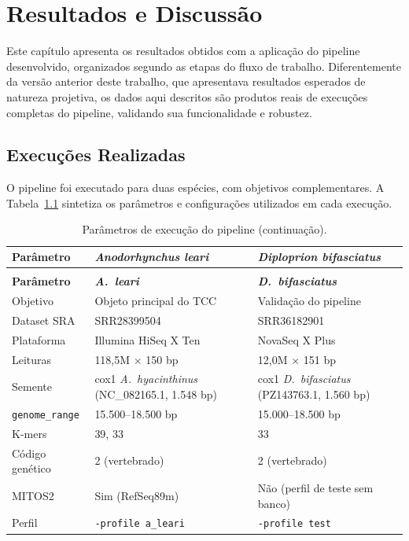 
\chapter{Resultados e Discussão}
\label{cap:resultados}

Este capítulo apresenta os resultados obtidos com a aplicação do pipeline desenvolvido, organizados segundo as etapas do fluxo de trabalho. Diferentemente da versão anterior deste trabalho, que apresentava resultados esperados de natureza projetiva, os dados aqui descritos são produtos reais de execuções completas do pipeline, validando sua funcionalidade e robustez.

\section{Execuções Realizadas}

O pipeline foi executado para duas espécies, com objetivos complementares. A Tabela~\ref{tab:execucoes} sintetiza os parâmetros e configurações utilizados em cada execução.

\begin{longtable}{@{}p{3.8cm}p{5.2cm}p{5.2cm}@{}}
\caption{Parâmetros de execução do pipeline para as duas espécies analisadas.}
\label{tab:execucoes} \\
\toprule
\textbf{Parâmetro} & \textbf{\textit{Anodorhynchus leari}} & \textbf{\textit{Diploprion bifasciatus}} \\
\midrule
\endfirsthead
\caption[]{Parâmetros de execução do pipeline (continuação).} \\
\toprule
\textbf{Parâmetro} & \textbf{\textit{A.~leari}} & \textbf{\textit{D.~bifasciatus}} \\
\midrule
\endhead
\bottomrule
\endfoot
Objetivo & Objeto principal do TCC & Validação do pipeline \\
\addlinespace
Dataset SRA & SRR28399504 & SRR36182901 \\
\addlinespace
Plataforma & Illumina HiSeq X Ten & NovaSeq X Plus \\
\addlinespace
Leituras & 118,5M $\times$ 150 bp & 12,0M $\times$ 151 bp \\
\addlinespace
Semente & cox1 \textit{A.~hyacinthinus} (NC\_082165.1, 1.548 bp) & cox1 \textit{D.~bifasciatus} (PZ143763.1, 1.560 bp) \\
\addlinespace
\texttt{genome\_range} & 15.500--18.500 bp & 15.000--18.500 bp \\
\addlinespace
K-mers & 39, 33 & 33 \\
\addlinespace
Código genético & 2 (vertebrado) & 2 (vertebrado) \\
\addlinespace
MITOS2 & Sim (RefSeq89m) & Não (perfil de teste sem banco) \\
\addlinespace
Perfil & \texttt{-profile a\_leari} & \texttt{-profile test} \\
\end{longtable}

